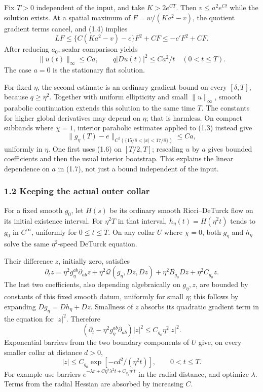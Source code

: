 \documentclass[
  10pt,
]{article}
\begin{document}
Fix \(T>0\) independent of the input, and take \(K>2e^{CT}\). Then
\(v\le a^2e^{Ct}\) while the solution exists. At a spatial maximum of
\(F=w/(Ka^2-v)\), the quotient gradient terms cancel, and (1.4) implies
\[
 LF\le\{C(Ka^2-v)-c\}F^2+CF
                   \le-c'F^2+CF.                    \tag{1.5}
\] After reducing \(a_0\), scalar comparison yields \[
 \|u(t)\|_\infty\le Ca,\qquad
 q|Du(t)|^2\le Ca^2/t\quad(0<t\le T).                \tag{1.6}
\] The case \(a=0\) is the stationary flat solution.

For fixed \(\eta\), the second estimate is an ordinary gradient bound on
every \([\delta,T]\), because \(q\ge\eta^2\). Together with uniform
ellipticity and small \(\|u\|_\infty\), smooth parabolic continuation
extends this solution to the same time \(T\). The constants for higher
global derivatives may depend on \(\eta\); that is harmless. On compact
subbands where \(\chi=1\), interior parabolic estimates applied to (1.3)
instead give \[
 \|g_\eta(T)-e\|_{C^2(\{15/8<|x|<17/8\})}\le Ca,     \tag{1.7}
\] uniformly in \(\eta\). One first uses (1.6) on \([T/2,T]\); rescaling
\(u\) by \(a\) gives bounded coefficients and then the usual interior
bootstrap. This explains the linear dependence on \(a\) in (1.7), not
just a bound independent of the input.

\hypertarget{keeping-the-actual-outer-collar}{%
\subsubsection{1.2 Keeping the actual outer
collar}\label{keeping-the-actual-outer-collar}}

For a fixed smooth \(g_0\), let \(H(s)\) be its ordinary smooth
Ricci--DeTurck flow on its initial existence interval. For \(\eta^2T\)
in that interval, \(h_\eta(t)=H(\eta^2t)\) tends to \(g_0\) in
\(C^\infty\), uniformly for \(0\le t\le T\). On any collar \(U\) where
\(\chi=0\), both \(g_\eta\) and \(h_\eta\) solve the same
\(\eta^2\)-speed DeTurck equation.

Their difference \(z\), initially zero, satisfies \[
 \partial_t z=\eta^2g_\eta^{ab}\partial_{ab}z
       +\eta^2\mathcal Q(g_\eta,Dz,Dz)
       +\eta^2B_{g_0}Dz+\eta^2C_{g_0}z.               \tag{1.8}
\] The last two coefficients, also depending algebraically on
\(g_\eta,z\), are bounded by constants of this fixed smooth datum,
uniformly for small \(\eta\); this follows by expanding
\(Dg_\eta=Dh_\eta+Dz\). Smallness of \(z\) absorbs its quadratic
gradient term in the equation for \(|z|^2\). Therefore \[
 (\partial_t-\eta^2g_\eta^{ab}\partial_{ab})|z|^2
                                      \le C_{g_0}\eta^2|z|^2 .
\] Exponential barriers from the two boundary components of \(U\) give,
on every smaller collar at distance \(d>0\), \[
 |z|\le C_{g_0}\exp[-c d^2/(\eta^2t)],\qquad 0<t\le T. \tag{1.9}
\] For example use barriers
\(e^{-\lambda r+C\eta^2\lambda^2t+ C_{g_0}\eta^2t}\) in the radial
distance, and optimize \(\lambda\). Terms from the radial Hessian are
absorbed by increasing \(C\).
\end{document}
